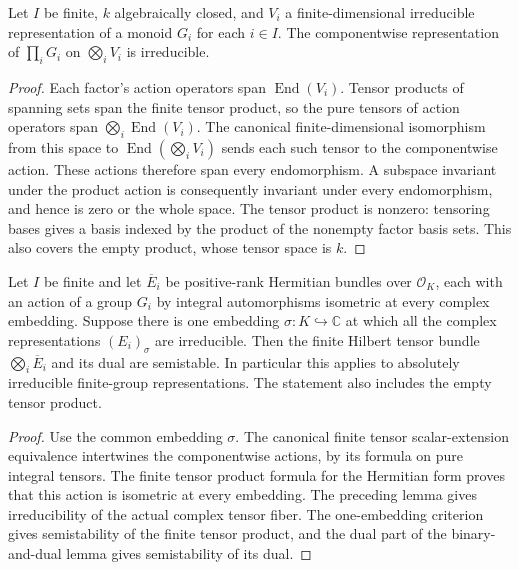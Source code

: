 \begin{lemma}
\label{lem:finite-independent-tensor-irreducible}
\leanok
Let $I$ be finite, $k$ algebraically closed, and $V_i$ a finite-dimensional
irreducible representation of a monoid $G_i$ for each $i\in I$.
The componentwise representation of $\prod_iG_i$ on $\bigotimes_iV_i$
is irreducible.
\end{lemma}
\begin{proof}
Each factor's action operators span $\operatorname{End}(V_i)$.
Tensor products of spanning sets span the finite tensor product, so
the pure tensors of action operators span
$\bigotimes_i\operatorname{End}(V_i)$. The canonical finite-dimensional
isomorphism from this space to $\operatorname{End}(\bigotimes_iV_i)$
sends each such tensor to the componentwise action. These actions
therefore span every endomorphism. A subspace invariant under the
product action is consequently invariant under every endomorphism,
and hence is zero or the whole space. The tensor product is nonzero:
tensoring bases gives a basis indexed by the product of the nonempty
factor basis sets. This also covers the empty product, whose tensor
space is $k$.
\end{proof}

\begin{lemma}
\label{lem:independent-irreducible-semistable}
\leanok
Let $I$ be finite and let $\overline E_i$ be positive-rank Hermitian bundles
over $\mathcal O_K$, each with an action of a group $G_i$ by integral
automorphisms isometric at every complex embedding. Suppose there is one
embedding $\sigma:K\hookrightarrow\mathbb C$ at which all the complex
representations $(E_i)_\sigma$ are irreducible. Then the finite Hilbert tensor
bundle $\bigotimes_i\overline E_i$ and its dual are semistable.
In particular this applies to absolutely irreducible finite-group
representations. The statement also includes the empty tensor product.
\end{lemma}
\begin{proof}
Use the common embedding $\sigma$. The canonical finite tensor scalar-extension
equivalence intertwines the componentwise actions, by its formula on
pure integral tensors. The finite tensor product formula for the
Hermitian form proves that this action is isometric at every embedding.
The preceding lemma gives irreducibility of the actual complex tensor
fiber. The one-embedding criterion gives semistability of the finite
tensor product, and the dual part of the binary-and-dual lemma gives
semistability of its dual.
\end{proof}
